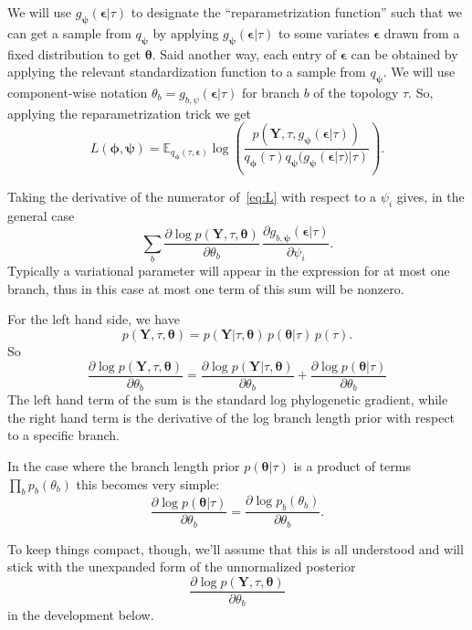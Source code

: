 \documentclass{article}
\begin{document}
We will use $g_{\bm{\psi}}(\bm{\epsilon}|\tau)$ to designate the ``reparametrization function'' such that we can get a sample from $q_{\bm\psi}$ by applying $g_{\bm{\psi}}(\bm{\epsilon}|\tau)$ to some variates $\bm\epsilon$ drawn from a fixed distribution to get $\bm\theta$.
Said another way, each entry of $\bm{\epsilon}$ can be obtained by applying the relevant standardization function to a sample from $q_{\bm\psi}$.
We will use component-wise notation $\theta_b = g_{b, \psi}(\bm\epsilon|\tau)$ for branch $b$ of the topology $\tau$.
So, applying the reparametrization trick we get
\begin{equation}
L(\bm{\phi},{\bm{\psi}}) = \mathbb{E}_{
    q_{\bm{\phi}}(\tau,\bm{\epsilon})}
    \log\left(
        \frac
        {p(\bm{Y},\tau,g_{\bm{\psi}}(\bm{\epsilon}|\tau))}
        {q_{\bm{\phi}}(\tau)q_{\bm{\psi}}(g_{\bm{\psi}}(\bm{\epsilon}|\tau)|\tau)}
    \right).
\label{eq:L}
\end{equation}

Taking the derivative of the numerator of~\eqref{eq:L} with respect to a $\psi_i$ gives, in the general case
\begin{equation}
    \sum_b
    \frac{\partial \log p(\bm{Y} , \tau, \bm\theta)}{\partial \theta_b} \,
    \frac{\partial g_{b,\bm\psi}(\bm\epsilon | \tau)}{\partial \psi_i}.
    \label{eq:dlogpdPsi}
\end{equation}
Typically a variational parameter will appear in the expression for at most one branch, thus in this case at most one term of this sum will be nonzero.

For the left hand side, we have
\[
p(\bm{Y},\tau,\bm\theta) =
p(\bm{Y}|\tau,\bm\theta) \, p(\bm\theta | \tau) \, p(\tau).
\]
So
\begin{equation*}
\frac{\partial \log p(\bm{Y}, \tau, \bm\theta)}{\partial \theta_b} =
\frac{\partial \log p(\bm{Y} | \tau, \bm\theta)}{\partial \theta_b}
+
\frac{\partial \log p(\bm\theta | \tau)}{\partial \theta_b}
\end{equation*}
The left hand term of the sum is the standard log phylogenetic gradient, while the right hand term is the derivative of the log branch length prior with respect to a specific branch.

In the case where the branch length prior $p(\bm\theta | \tau)$ is a product of terms $\prod_b p_b(\theta_b)$ this becomes very simple:
\[
    \frac{\partial \log p(\bm\theta | \tau)}{\partial \theta_b} =
    \frac{\partial \log p_b(\theta_b)}{\partial \theta_b}.
\]

To keep things compact, though, we'll assume that this is all understood and will stick with the unexpanded form of the unnormalized posterior
\[
    \frac{\partial \log p(\bm{Y}, \tau, \bm\theta)}{\partial \theta_b}
\]
in the development below.
\end{document}
